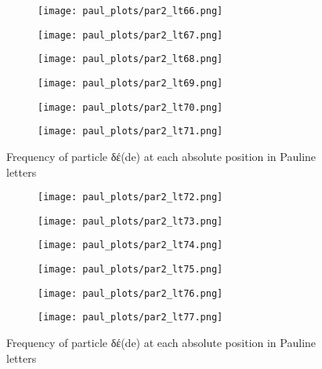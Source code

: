 \documentclass[a4paper]{article}
\begin{document}
\begin{figure}
\begin{subfigure}{0.45\textwidth}
\centering
\texttt{[image: paul\_plots/par2\_lt66.png]}
\end{subfigure}
\begin{subfigure}{0.45\textwidth}
\centering
\texttt{[image: paul\_plots/par2\_lt67.png]}
\end{subfigure}
\begin{subfigure}{0.45\textwidth}
\centering
\texttt{[image: paul\_plots/par2\_lt68.png]}
\end{subfigure}
\begin{subfigure}{0.45\textwidth}
\centering
\texttt{[image: paul\_plots/par2\_lt69.png]}
\end{subfigure}
\begin{subfigure}{0.45\textwidth}
\centering
\texttt{[image: paul\_plots/par2\_lt70.png]}
\end{subfigure}
\begin{subfigure}{0.45\textwidth}
\centering
\texttt{[image: paul\_plots/par2\_lt71.png]}
\end{subfigure}
\caption{Frequency of particle \textgreek{δέ}(de) at each absolute position in Pauline letters}
\label{paul_de}
\end{figure}

\begin{figure}
\ContinuedFloat
\begin{subfigure}{0.45\textwidth}
\centering
\texttt{[image: paul\_plots/par2\_lt72.png]}
\end{subfigure}
\begin{subfigure}{0.45\textwidth}
\centering
\texttt{[image: paul\_plots/par2\_lt73.png]}
\end{subfigure}
\begin{subfigure}{0.45\textwidth}
\centering
\texttt{[image: paul\_plots/par2\_lt74.png]}
\end{subfigure}
\begin{subfigure}{0.45\textwidth}
\centering
\texttt{[image: paul\_plots/par2\_lt75.png]}
\end{subfigure}
\begin{subfigure}{0.45\textwidth}
\centering
\texttt{[image: paul\_plots/par2\_lt76.png]}
\end{subfigure}
\begin{subfigure}{0.45\textwidth}
\centering
\texttt{[image: paul\_plots/par2\_lt77.png]}
\end{subfigure}
\caption{Frequency of particle \textgreek{δέ}(de) at each absolute position in Pauline letters}
\end{figure}
\end{document}

